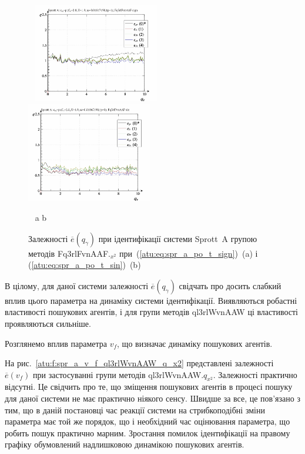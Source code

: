\begin{figure}[htb!]
\begin{center}
  ~ \hfill
    \includegraphics[width=0.49\textwidth]{p/cha/spr_a/Fq3rlFvnAAF_x2/sprott_a_id-p_q_gamma_sign.png}
    \hfill
    \includegraphics[width=0.49\textwidth]{p/cha/spr_a/Fq3rlFvnAAF_x2/sprott_a_id-p_q_gamma_sin.png}
  \hfill ~
\end{center}
  \vspace{-1.0ex}
  \begin{center}
    ~ \hfill a \hfill\hfill b \hfill ~
  \end{center}
  \caption{Залежності $\overline{e} (q_\gamma)$ при ідентифікації системи Sprott~A групою методів Fq3rlFvnAAF.$_{x^2}$ при~(\ref{atu:eq:spr_a_po_t_sign})~(a) і (\ref{atu:eq:spr_a_po_t_sin})~(b)}
  \label{atu:f:spr_a_qg_Fq3rlFvnAAF_q_x2}
\end{figure}

В цілому, для даної системи залежності
$\overline{e}(q_\gamma)$ свідчать про досить слабкий вплив цього
параметра на динаміку системи ідентифікації. Виявляються
робастні властивості пошукових агентів, і для групи методів
ql3rlWvnAAW ці властивості проявляються сильніше.


Розглянемо вплив параметра
$v_f$, що визначає динаміку пошукових агентів.

На рис.~\ref{atu:f:spr_a_v_f_ql3rlWvnAAW_q_x2} представлені залежності
$\overline{e} (v_f)$ при застосуванні групи методів ql3rlWvnAAW.$q_{x^2}$.
Залежності практично відсутні. Це свідчить про те, що зміщення
пошукових агентів в процесі пошуку для даної системи не має
практично ніякого сенсу. Швидше за все, це пов'язано з тим, що в
даній постановці час реакції системи на стрибкоподібні зміни
параметра має той же порядок, що і необхідний час оцінювання
параметра, що робить пошук практично марним. Зростання помилок
ідентифікації на правому графіку обумовлений надлишковою
динамікою пошукових агентів.




